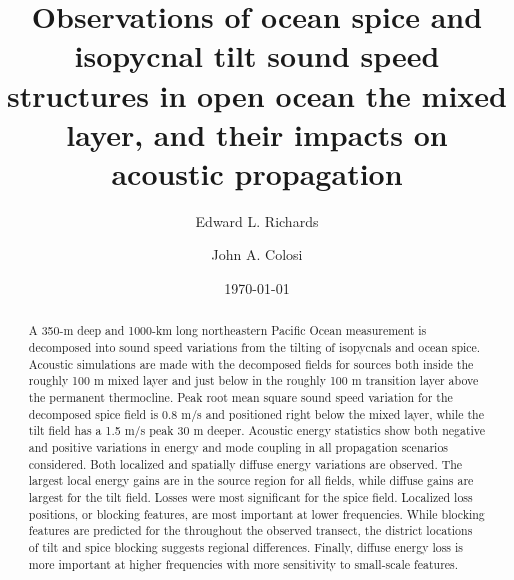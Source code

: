 \documentclass[preprint,NumberedRefs]{JASA}
\begin{document}
\title[Mixed layer tilt and spice]{Observations of ocean spice and isopycnal tilt sound speed structures in open ocean the mixed layer, and their impacts on acoustic propagation}
\author{Edward L. Richards}
\author{John A. Colosi}

\date{\today}

\begin{abstract}
A 350-m deep and 1000-km long northeastern Pacific Ocean measurement is decomposed into sound speed variations from the tilting of isopycnals and ocean spice. Acoustic simulations are made with the decomposed fields for sources both inside the roughly 100 m mixed layer and just below in the roughly 100 m transition layer above the permanent thermocline. Peak root mean square sound speed variation for the decomposed spice field is 0.8 m/s and positioned right below the mixed layer, while the tilt field has a 1.5 m/s peak 30 m deeper. Acoustic energy statistics show both negative and positive variations in energy and mode coupling in all propagation scenarios considered. Both localized and spatially diffuse energy variations are observed. The largest local energy gains are in the source region for all fields, while diffuse gains are largest for the tilt field. Losses were most significant for the spice field. Localized loss positions, or blocking features, are most important at lower frequencies. While blocking features are predicted for the throughout the observed transect, the district locations of tilt and spice blocking suggests regional differences. Finally, diffuse energy loss is more important at higher frequencies with more sensitivity to small-scale features.
\end{abstract}

\maketitle
\end{document}
